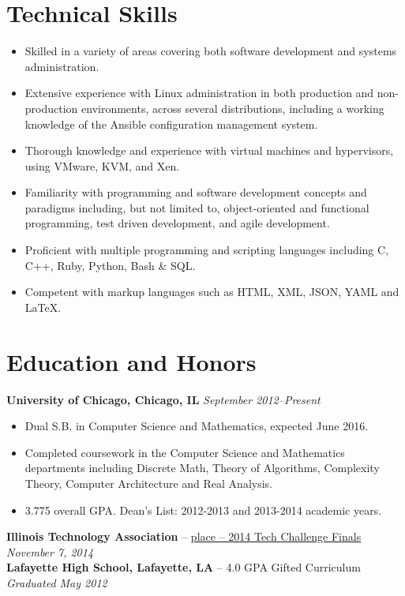 \documentclass[10pt,letterpaper]{article} %
\begin{document}
    \section*{Technical Skills} 
        \begin{itemize}
        \item Skilled in a variety of areas covering both software development and systems administration. 
        \item Extensive experience with Linux administration in both production and non-production environments, across several distributions, 
        including a working knowledge of the Ansible configuration management system.
        \item Thorough knowledge and experience with virtual machines and hypervisors, using VMware, KVM, and Xen. 
        \item Familiarity with programming and software development concepts and paradigms including, but not limited to, 
        object-oriented and functional programming, test driven development, and agile development.
        \item Proficient with multiple programming and scripting languages including C, C++, Ruby, Python, Bash \& SQL.
        \item Competent with markup languages such as HTML, XML, JSON, YAML and \LaTeX.
        \end{itemize}          
    \section*{Education and Honors}
        \textbf{University of Chicago, Chicago, IL} \hfill \textit{ September 2012--Present } 
        \begin{itemize} 
            \item Dual S.B. in Computer Science and Mathematics, expected June 2016. 
            \item Completed coursework in the Computer Science and Mathematics departments including Discrete Math, Theory of Algorithms, Complexity Theory, Computer Architecture and Real Analysis.  
            \item 3.775 overall GPA. Dean's List: 2012-2013 and 2013-2014 academic years. 
        \end{itemize}
        \textbf{Illinois Technology Association} -- \href{http://www.chicagotribune.com/bluesky/originals/chi-university-of-chicago-student-wins-tech-challenge-bsi-story.html}{ place -- 2014 Tech Challenge Finals} \hfill \textit{November 7, 2014} 
        \vspace{0.5em}\\
        \textbf{Lafayette High School, Lafayette, LA} -- 4.0 GPA Gifted Curriculum \hfill \textit{Graduated May 2012 } 
\end{document}
